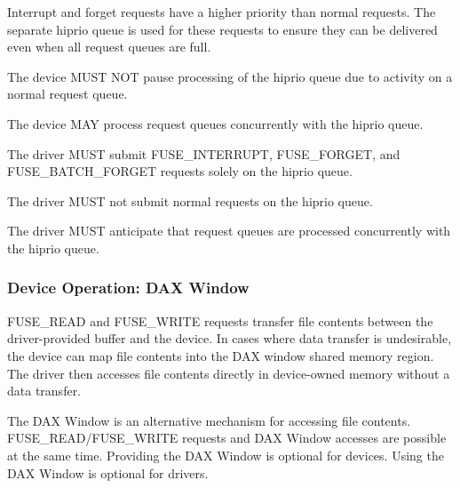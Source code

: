 Interrupt and forget requests have a higher priority than normal requests.  The
separate hiprio queue is used for these requests to ensure they can be
delivered even when all request queues are full.


The device MUST NOT pause processing of the hiprio queue due to activity on a
normal request queue.

The device MAY process request queues concurrently with the hiprio queue.


The driver MUST submit FUSE\_INTERRUPT, FUSE\_FORGET, and FUSE\_BATCH\_FORGET requests solely on the hiprio queue.

The driver MUST not submit normal requests on the hiprio queue.

The driver MUST anticipate that request queues are processed concurrently with the hiprio queue.

\subsubsection{Device Operation: DAX Window}\label{sec:Device Types / File System Device / Device Operation / Device Operation: DAX Window}

FUSE\_READ and FUSE\_WRITE requests transfer file contents between the
driver-provided buffer and the device.  In cases where data transfer is
undesirable, the device can map file contents into the DAX window shared memory
region.  The driver then accesses file contents directly in device-owned memory
without a data transfer.

The DAX Window is an alternative mechanism for accessing file contents.
FUSE\_READ/FUSE\_WRITE requests and DAX Window accesses are possible at the
same time.  Providing the DAX Window is optional for devices.  Using the DAX
Window is optional for drivers.

